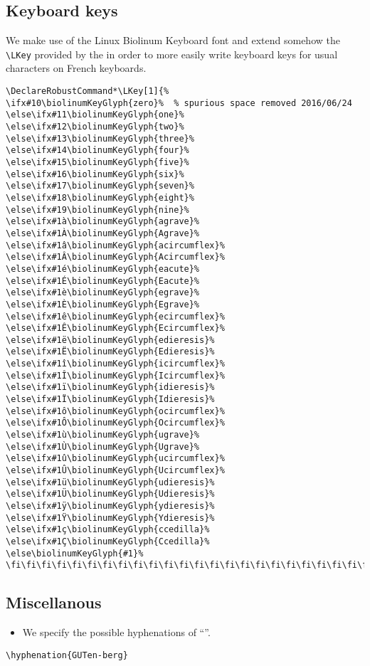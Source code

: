 \documentclass{letgut}
\begin{document}
\subsection{Keyboard keys}
\label{ImplementationKeyboardkeys-qa0h55h0jlj0}
We make use of the Linux Biolinum Keyboard font and extend somehow the \lstinline+\LKey+
provided by the  in order to more easily write keyboard keys
for usual characters on French keyboards.

\begin{lstlisting}
\DeclareRobustCommand*\LKey[1]{%
\ifx#10\biolinumKeyGlyph{zero}%  % spurious space removed 2016/06/24
\else\ifx#11\biolinumKeyGlyph{one}%
\else\ifx#12\biolinumKeyGlyph{two}%
\else\ifx#13\biolinumKeyGlyph{three}%
\else\ifx#14\biolinumKeyGlyph{four}%
\else\ifx#15\biolinumKeyGlyph{five}%
\else\ifx#16\biolinumKeyGlyph{six}%
\else\ifx#17\biolinumKeyGlyph{seven}%
\else\ifx#18\biolinumKeyGlyph{eight}%
\else\ifx#19\biolinumKeyGlyph{nine}%
\else\ifx#1à\biolinumKeyGlyph{agrave}%
\else\ifx#1À\biolinumKeyGlyph{Agrave}%
\else\ifx#1â\biolinumKeyGlyph{acircumflex}%
\else\ifx#1Â\biolinumKeyGlyph{Acircumflex}%
\else\ifx#1é\biolinumKeyGlyph{eacute}%
\else\ifx#1É\biolinumKeyGlyph{Eacute}%
\else\ifx#1è\biolinumKeyGlyph{egrave}%
\else\ifx#1È\biolinumKeyGlyph{Egrave}%
\else\ifx#1ê\biolinumKeyGlyph{ecircumflex}%
\else\ifx#1Ê\biolinumKeyGlyph{Ecircumflex}%
\else\ifx#1ë\biolinumKeyGlyph{edieresis}%
\else\ifx#1Ë\biolinumKeyGlyph{Edieresis}%
\else\ifx#1î\biolinumKeyGlyph{icircumflex}%
\else\ifx#1Î\biolinumKeyGlyph{Icircumflex}%
\else\ifx#1ï\biolinumKeyGlyph{idieresis}%
\else\ifx#1Ï\biolinumKeyGlyph{Idieresis}%
\else\ifx#1ô\biolinumKeyGlyph{ocircumflex}%
\else\ifx#1Ô\biolinumKeyGlyph{Ocircumflex}%
\else\ifx#1ù\biolinumKeyGlyph{ugrave}%
\else\ifx#1Ù\biolinumKeyGlyph{Ugrave}%
\else\ifx#1û\biolinumKeyGlyph{ucircumflex}%
\else\ifx#1Û\biolinumKeyGlyph{Ucircumflex}%
\else\ifx#1ü\biolinumKeyGlyph{udieresis}%
\else\ifx#1Ü\biolinumKeyGlyph{Udieresis}%
\else\ifx#1ÿ\biolinumKeyGlyph{ydieresis}%
\else\ifx#1Ÿ\biolinumKeyGlyph{Ydieresis}%
\else\ifx#1ç\biolinumKeyGlyph{ccedilla}%
\else\ifx#1Ç\biolinumKeyGlyph{Ccedilla}%
\else\biolinumKeyGlyph{#1}%
\fi\fi\fi\fi\fi\fi\fi\fi\fi\fi\fi\fi\fi\fi\fi\fi\fi\fi\fi\fi\fi\fi\fi\fi\fi\fi\fi\fi\fi\fi\fi\fi\fi\fi\fi\fi\fi\fi}
\end{lstlisting}

\subsection{Miscellanous}
\label{ImplementationMiscellanous-r11h55h0jlj0}
\begin{itemize}
\item We specify the possible hyphenations of \enquote{\gutenberg}.
\end{itemize}
\begin{lstlisting}
\hyphenation{GUTen-berg}
\end{lstlisting}
\end{document}

